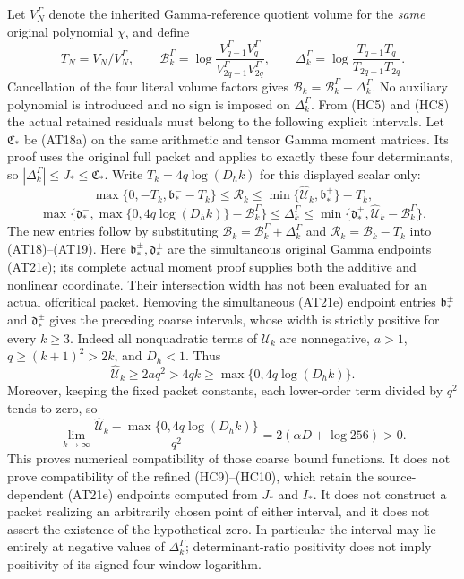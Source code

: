Let $V_N^\Gamma$ denote the inherited Gamma-reference quotient volume
for the \emph{same} original polynomial $\chi$, and define
\[
 T_N=V_N/V_N^\Gamma,\qquad
 \mathcal B_k^\Gamma=\log\frac{V_{q-1}^\Gamma V_q^\Gamma}
 {V_{2q-1}^\Gamma V_{2q}^\Gamma},\qquad
 \Delta_k^\Gamma=\log\frac{T_{q-1}T_q}{T_{2q-1}T_{2q}}.
\]
Cancellation of the four literal volume factors gives
$\mathcal B_k=\mathcal B_k^\Gamma+\Delta_k^\Gamma$.
No auxiliary polynomial is introduced and no sign is imposed on
$\Delta_k^\Gamma$.  From (HC5) and (HC8) the actual retained residuals
must belong to the following explicit intervals. Let $\mathfrak C_*$
be (AT18a) on the same arithmetic and tensor Gamma moment matrices.
Its proof uses the original full packet and applies to exactly these
four determinants, so $|\Delta_k^\Gamma|\le J_*\le\mathfrak C_*$.
Write $T_k=4q\log(D_hk)$ for this displayed scalar only:
\[
 \boxed{
 \max\{0,-T_k,\mathfrak b_*^--T_k\}
 \leq\mathcal R_k
 \leq\min\{\widehat{\mathcal U}_k,\mathfrak b_*^+\}-T_k,}
 \tag{HC9}
\]
\[
 \boxed{
 \max\{\mathfrak d_*^-,\max\{0,4q\log(D_hk)\}-\mathcal B_k^\Gamma\}
 \leq\Delta_k^\Gamma
 \leq\min\{\mathfrak d_*^+,\widehat{\mathcal U}_k-\mathcal B_k^\Gamma\}.}
 \tag{HC10}
\]
The new entries follow by substituting
$\mathcal B_k=\mathcal B_k^\Gamma+\Delta_k^\Gamma$ and
$\mathcal R_k=\mathcal B_k-T_k$ into (AT18)--(AT19).
Here $\mathfrak b_*^\pm,\mathfrak d_*^\pm$ are the
simultaneous original Gamma endpoints (AT21e); its complete actual
moment proof supplies both the additive and nonlinear coordinate.
Their intersection width has not been evaluated for an actual
offcritical packet. Removing the simultaneous (AT21e) endpoint
entries $\mathfrak b_*^\pm$ and $\mathfrak d_*^\pm$ gives
the preceding coarse intervals, whose width is strictly positive
for every $k\geq3$.
Indeed all nonquadratic terms of $\mathcal U_k$ are nonnegative,
$a>1$, $q\geq(k+1)^2>2k$, and $D_h<1$.  Thus
\[
 \widehat{\mathcal U}_k\geq2a q^2
 >4qk\geq\max\{0,4q\log(D_hk)\}.
\]
Moreover, keeping the fixed packet constants, each lower-order term
divided by $q^2$ tends to zero, so
\[
 \lim_{k\to\infty}
 \frac{\widehat{\mathcal U}_k-\max\{0,4q\log(D_hk)\}}{q^2}
 =2(\alpha D+\log256)>0.\tag{HC11}
\]
This proves numerical compatibility of those coarse bound functions.
It does not prove compatibility of the refined (HC9)--(HC10),
which retain the source-dependent (AT21e) endpoints computed
from $J_*$ and $I_*$.  It does not construct a packet realizing an arbitrarily
chosen point of either interval, and it does not assert the existence
of the hypothetical zero.  In particular the interval may lie entirely
at negative values of $\Delta_k^\Gamma$; determinant-ratio positivity
does not imply positivity of its signed four-window logarithm.


